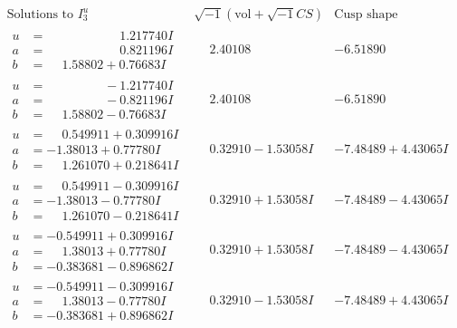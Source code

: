 \documentclass[1p]{elsarticle_modified}
\theoremstyle{definition}
\newcommand{\I}{\sqrt{-1}}
\begin{document}
$$\begin{array}{c|c|c}  
\text{Solutions to }I^u_{3}& \I (\text{vol} + \sqrt{-1}CS) & \text{Cusp shape}\\
 \hline 
\begin{aligned}
u &= \phantom{-0.000000 -}1.217740 I \\
a &= \phantom{-0.000000 -}0.821196 I \\
b &= \phantom{-}1.58802 + 0.76683 I\end{aligned}
 & \phantom{-}2.40108\phantom{ +0.000000I} & -6.51890\phantom{ +0.000000I} \\ \hline\begin{aligned}
u &= \phantom{-0.000000 } -1.217740 I \\
a &= \phantom{-0.000000 } -0.821196 I \\
b &= \phantom{-}1.58802 - 0.76683 I\end{aligned}
 & \phantom{-}2.40108\phantom{ +0.000000I} & -6.51890\phantom{ +0.000000I} \\ \hline\begin{aligned}
u &= \phantom{-}0.549911 + 0.309916 I \\
a &= -1.38013 + 0.77780 I \\
b &= \phantom{-}1.261070 + 0.218641 I\end{aligned}
 & \phantom{-}0.32910 - 1.53058 I & -7.48489 + 4.43065 I \\ \hline\begin{aligned}
u &= \phantom{-}0.549911 - 0.309916 I \\
a &= -1.38013 - 0.77780 I \\
b &= \phantom{-}1.261070 - 0.218641 I\end{aligned}
 & \phantom{-}0.32910 + 1.53058 I & -7.48489 - 4.43065 I \\ \hline\begin{aligned}
u &= -0.549911 + 0.309916 I \\
a &= \phantom{-}1.38013 + 0.77780 I \\
b &= -0.383681 - 0.896862 I\end{aligned}
 & \phantom{-}0.32910 + 1.53058 I & -7.48489 - 4.43065 I \\ \hline\begin{aligned}
u &= -0.549911 - 0.309916 I \\
a &= \phantom{-}1.38013 - 0.77780 I \\
b &= -0.383681 + 0.896862 I\end{aligned}
 & \phantom{-}0.32910 - 1.53058 I & -7.48489 + 4.43065 I \\ \hline\begin{aligned}

\end{aligned}
\end{array}$$
\end{document}
